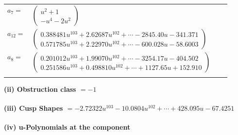 \documentclass[1p]{elsarticle_modified}
\theoremstyle{definition}
\begin{document}
\begin{tabular}{m{7pt} m{180pt} m{7pt} m{180pt} }
\flushright $a_{7}=$&$\begin{pmatrix}u^2+1\\- u^4-2 u^2\end{pmatrix}$ \\
\flushright $a_{12}=$&$\begin{pmatrix}0.388481 u^{103}+2.62687 u^{102}+\cdots-2845.40 u-341.371\\0.571785 u^{103}+2.22970 u^{102}+\cdots-600.028 u-58.6003\end{pmatrix}$ \\
\flushright $a_{8}=$&$\begin{pmatrix}0.201012 u^{103}+1.99070 u^{102}+\cdots-3254.17 u-404.502\\0.251586 u^{103}+0.498810 u^{102}+\cdots+1127.65 u+152.910\end{pmatrix}$\\&\end{tabular}
\flushleft \textbf{(ii) Obstruction class $= -1$}\\~\\
\flushleft \textbf{(iii) Cusp Shapes $= -2.72322 u^{103}-10.0804 u^{102}+\cdots+428.095 u-67.4251$}\\~\\
\newpage\renewcommand{\arraystretch}{1}
\flushleft \textbf{(iv) u-Polynomials at the component}\newline \\
\end{document}

